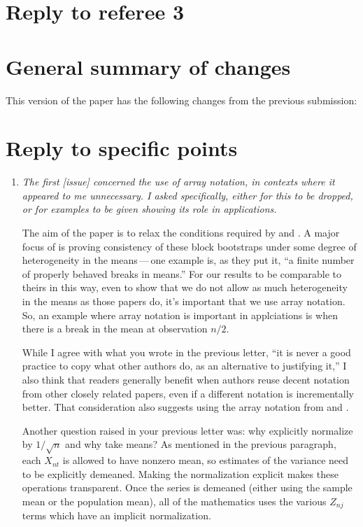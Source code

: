 \documentclass[12pt]{article}
\begin{document}
\section*{\hfill Reply to referee 3\hfill}
\section*{General summary of changes}
This version of the paper has the following changes from the
previous submission:


\section*{Reply to specific points}

\begin{enumerate}
\item \textit{The first [issue] concerned the use of array notation,
    in contexts where it appeared to me unnecessary. I asked
    specifically, either for this to be dropped, or for examples to be
    given showing its role in applications.}

  The aim of the paper is to relax the conditions required by
  \cite{GoW:02} and \cite{GoJ:03}. A major focus of \cite{GoW:02} is
  proving consistency of these block bootstraps under some degree of
  heterogeneity in the means\,---\,one example is, as they put it, ``a
  finite number of properly behaved breaks in means.'' For our results
  to be comparable to theirs in this way, even to show that we do not
  allow as much heterogeneity in the means as those papers do, it's
  important that we use array notation. So, an example where array
  notation is important in applciations is when there is a break in
  the mean at observation $n/2$.

  While I agree with what you wrote in the previous letter, ``it is
  never a good practice to copy what other authors do, as an
  alternative to justifying it,'' I also think that readers generally
  benefit when authors reuse decent notation from other closely
  related papers, even if a different notation is incrementally
  better. That consideration also suggests using the array notation
  from \cite{GoW:02} and \cite{GoJ:03}.

  Another question raised in your previous letter was: why explicitly
  normalize by $1/\sqrt{n}$ and why take means? As mentioned in the
  previous paragraph, each $X_{nt}$ is allowed to have nonzero mean,
  so estimates of the variance need to be explicitly demeaned. Making
  the normalization explicit makes these operations transparent. Once
  the series is demeaned (either using the sample mean or the
  population mean), all of the mathematics uses the various $Z_{nj}$
  terms which have an implicit normalization.


\end{enumerate}
\end{document}

